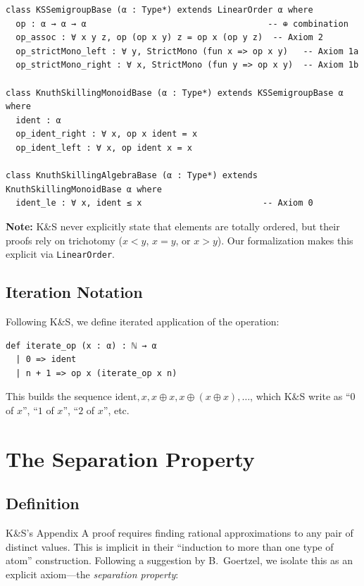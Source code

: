 \documentclass[11pt]{article}
\theoremstyle{definition}
\theoremstyle{remark}
\begin{document}
\begin{lstlisting}[caption={Core K\&S algebra axioms (identity-free hierarchy)}]
class KSSemigroupBase (α : Type*) extends LinearOrder α where
  op : α → α → α                                    -- ⊕ combination
  op_assoc : ∀ x y z, op (op x y) z = op x (op y z)  -- Axiom 2
  op_strictMono_left : ∀ y, StrictMono (fun x => op x y)   -- Axiom 1a
  op_strictMono_right : ∀ x, StrictMono (fun y => op x y)  -- Axiom 1b

class KnuthSkillingMonoidBase (α : Type*) extends KSSemigroupBase α where
  ident : α
  op_ident_right : ∀ x, op x ident = x
  op_ident_left : ∀ x, op ident x = x

class KnuthSkillingAlgebraBase (α : Type*) extends KnuthSkillingMonoidBase α where
  ident_le : ∀ x, ident ≤ x                        -- Axiom 0
\end{lstlisting}

\textbf{Note:} K\&S never explicitly state that elements are totally ordered, but their proofs rely on trichotomy ($x < y$, $x = y$, or $x > y$).
Our formalization makes this explicit via \texttt{LinearOrder}.

\subsection{Iteration Notation}

Following K\&S, we define iterated application of the operation:

\begin{lstlisting}[caption={Iteration definition}]
def iterate_op (x : α) : ℕ → α
  | 0 => ident
  | n + 1 => op x (iterate_op x n)
\end{lstlisting}

This builds the sequence $\text{ident}, x, x \oplus x, x \oplus (x \oplus x), \ldots$, which K\&S write as ``$0$ of $x$'', ``$1$ of $x$'', ``$2$ of $x$'', etc.

\section{The Separation Property}
\label{sec:separation}

\subsection{Definition}

K\&S's Appendix A proof requires finding rational approximations to any pair of distinct values.
This is implicit in their ``induction to more than one type of atom'' construction.
Following a suggestion by B.\ Goertzel, we isolate this as an explicit axiom---the \emph{separation property}:
\end{document}
